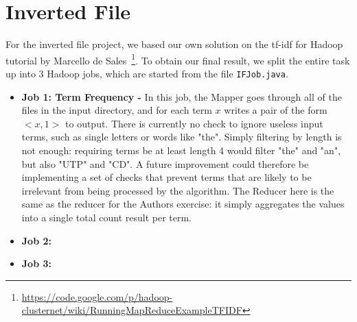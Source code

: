 \documentclass[11pt]{article}
\begin{document}
\section{Inverted File}
For the inverted file project, we based our own solution on the tf-idf for Hadoop tutorial by Marcello de Sales~\footnote{\url{https://code.google.com/p/hadoop-clusternet/wiki/RunningMapReduceExampleTFIDF}}. To obtain our final result, we split the entire task up into 3 Hadoop jobs, which are started from the file \lstinline{IFJob.java}.

\begin{itemize}

\item \textbf{Job 1: Term Frequency - } In this job, the Mapper goes through all of the files in the input directory, and for each term $x$ writes a pair of the form $<x, 1>$ to output. There is currently no check to ignore useless input terms, such as single letters or words like "the". Simply filtering by length is not enough: requiring terms be at least length 4 would filter "the" and "an", but also "UTP" and "CD". A future improvement could therefore be implementing a set of checks that prevent terms that are likely to be irrelevant from being processed by the algorithm.
The Reducer here is the same as the reducer for the Authors exercise: it simply aggregates the values into a single total count result per term.
\item \textbf{Job 2:}
\item \textbf{Job 3:}

\end{itemize}









\end{document}
